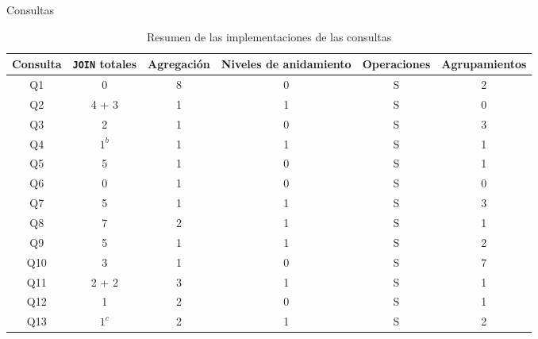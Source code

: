 \documentclass[10pt]{beamer}
\begin{document}
    \begin{frame}{Consultas}
      \tiny
      \begin{table}[H]
        \centering
        \begin{threeparttable}
        \caption{Resumen de las implementaciones de las consultas}
        \begin{tabular}{| c | c | c | c | c | c |}
          \hline
          Consulta        & \texttt{JOIN} totales & Agregación & Niveles de anidamiento & Operaciones & Agrupamientos \\ \hline
              Q1          &           0           &      8     &            0           &       S     &       2       \\ \hline
              Q2          &         4 + 3         &      1     &            1           &       S     &       0       \\ \hline
              Q3          &           2           &      1     &            0           &       S     &       3       \\ \hline
              Q4          &         $1^b$         &      1     &            1           &       S     &       1       \\ \hline
              Q5          &           5           &      1     &            0           &       S     &       1       \\ \hline
              Q6          &           0           &      1     &            0           &       S     &       0       \\ \hline
              Q7          &           5           &      1     &            1           &       S     &       3       \\ \hline
              Q8          &           7           &      2     &            1           &       S     &       1       \\ \hline
              Q9          &           5           &      1     &            1           &       S     &       2       \\ \hline
             Q10          &           3           &      1     &            0           &       S     &       7       \\ \hline
             Q11          &         2 + 2         &      3     &            1           &       S     &       1       \\ \hline
             Q12          &           1           &      2     &            0           &       S     &       1       \\ \hline
             Q13\tnote{a} &         $1^c$         &      2     &            1           &       S     &       2       \\ \hline

\end{tabular}
\end{threeparttable}
\end{table}
\end{frame}
\end{document}
